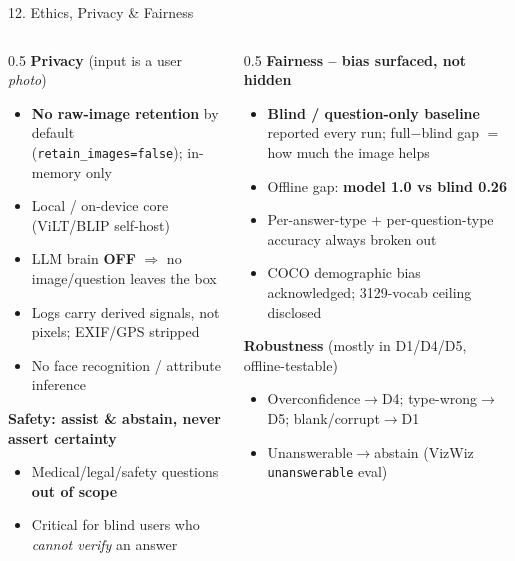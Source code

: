 \documentclass[10pt,aspectratio=169]{beamer}
\begin{document}
\begin{frame}{12. Ethics, Privacy \& Fairness}
\begin{columns}[T]
\begin{column}{0.5\textwidth}
\textbf{Privacy} (input is a user \emph{photo})
\begin{itemize}\scriptsize
  \item \textbf{No raw-image retention} by default (\texttt{retain\_images=false}); in-memory only
  \item Local / on-device core (ViLT/BLIP self-host)
  \item LLM brain \textbf{OFF} $\Rightarrow$ no image/question leaves the box
  \item Logs carry derived signals, not pixels; EXIF/GPS stripped
  \item No face recognition / attribute inference
\end{itemize}
\textbf{Safety: assist \& abstain, never assert certainty}
\begin{itemize}\scriptsize
  \item Medical/legal/safety questions \textbf{out of scope}
  \item Critical for blind users who \emph{cannot verify} an answer
\end{itemize}
\end{column}
\begin{column}{0.5\textwidth}
\textbf{Fairness -- bias surfaced, not hidden}
\begin{itemize}\scriptsize
  \item \textbf{Blind / question-only baseline} reported every run; full$-$blind gap $=$ how much the image helps
  \item Offline gap: \textbf{model 1.0 vs blind 0.26}
  \item Per-answer-type + per-question-type accuracy always broken out
  \item COCO demographic bias acknowledged; 3129-vocab ceiling disclosed
\end{itemize}
\textbf{Robustness} (mostly in D1/D4/D5, offline-testable)
\begin{itemize}\scriptsize
  \item Overconfidence$\to$D4; type-wrong$\to$D5; blank/corrupt$\to$D1
  \item Unanswerable$\to$abstain (VizWiz \texttt{unanswerable} eval)
\end{itemize}
\end{column}
\end{columns}
\end{frame}
\end{document}
